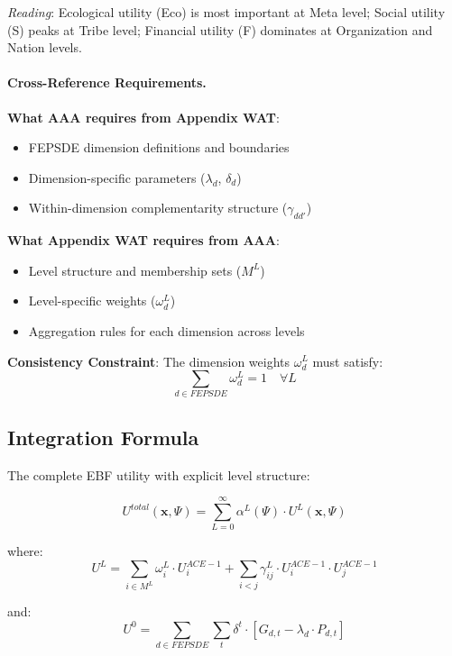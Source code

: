 \textit{Reading}: Ecological utility (Eco) is most important at Meta level; Social utility (S) 
peaks at Tribe level; Financial utility (F) dominates at Organization and Nation levels.

\paragraph{Cross-Reference Requirements.}

\begin{tcolorbox}[colback=yellow!5!white, colframe=yellow!75!black, title=Required Coordination: AAA $\leftrightarrow$ C]
\textbf{What AAA requires from Appendix WAT}:
\begin{itemize}[nosep]
\item FEPSDE dimension definitions and boundaries
\item Dimension-specific parameters ($\lambda_d$, $\delta_d$)
\item Within-dimension complementarity structure ($\gamma_{dd'}$)
\end{itemize}

\textbf{What Appendix WAT requires from AAA}:
\begin{itemize}[nosep]
\item Level structure and membership sets ($M^L$)
\item Level-specific weights ($\omega^L_d$)
\item Aggregation rules for each dimension across levels
\end{itemize}

\textbf{Consistency Constraint}:
The dimension weights $\omega^L_d$ must satisfy:
\begin{equation}
\sum_{d \in FEPSDE} \omega^L_d = 1 \quad \forall L
\end{equation}
\end{tcolorbox}

\subsection{Integration Formula}

The complete EBF utility with explicit level structure:

\begin{tcolorbox}[colback=blue!5!white, colframe=blue!75!black, title=Complete Multi-Level Utility]
\begin{equation}
\boxed{
U^{total}(\mathbf{x}, \Psi) = \sum_{L=0}^{\infty} \alpha^L(\Psi) \cdot U^L(\mathbf{x}, \Psi)
}
\end{equation}

where:
\begin{equation}
U^L = \sum_{i \in M^L} \omega^L_i \cdot U^{ACE-1}_i + \sum_{i < j} \gamma^L_{ij} \cdot U^{ACE-1}_i \cdot U^{ACE-1}_j
\end{equation}

and:
\begin{equation}
U^0 = \sum_{d \in FEPSDE} \sum_{t} \delta^t \cdot \left[ G_{d,t} - \lambda_d \cdot P_{d,t} \right]
\end{equation}
\end{tcolorbox}

